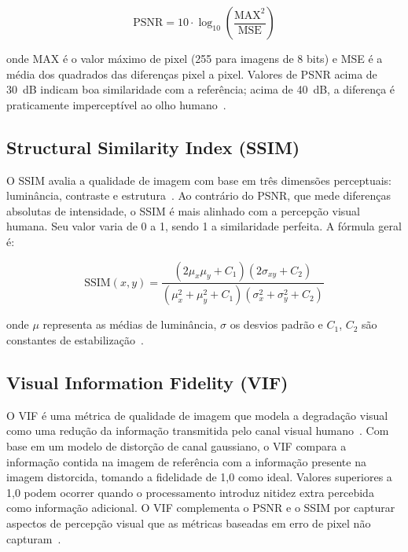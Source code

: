 \documentclass[twoside,english,brazilian]{UNISINOSmonografia}
\begin{document}
\begin{equation}
    \text{PSNR} = 10 \cdot \log_{10}\left(\frac{\text{MAX}^2}{\text{MSE}}\right)
    \label{eq:psnr}
\end{equation}

\noindent onde MAX é o valor máximo de pixel (255 para imagens de 8 bits) e MSE é a média dos quadrados das diferenças pixel a pixel. Valores de PSNR acima de 30~dB indicam boa similaridade com a referência; acima de 40~dB, a diferença é praticamente imperceptível ao olho humano~\cite{hore2010psnr}.

\subsection{Structural Similarity Index (SSIM)}

O SSIM avalia a qualidade de imagem com base em três dimensões perceptuais: luminância, contraste e estrutura~\cite{wang2004ssim}. Ao contrário do PSNR, que mede diferenças absolutas de intensidade, o SSIM é mais alinhado com a percepção visual humana. Seu valor varia de 0 a 1, sendo 1 a similaridade perfeita. A fórmula geral é:

\begin{equation}
    \text{SSIM}(x, y) = \frac{(2\mu_x\mu_y + C_1)(2\sigma_{xy} + C_2)}{(\mu_x^2 + \mu_y^2 + C_1)(\sigma_x^2 + \sigma_y^2 + C_2)}
    \label{eq:ssim}
\end{equation}

\noindent onde $\mu$ representa as médias de luminância, $\sigma$ os desvios padrão e $C_1$, $C_2$ são constantes de estabilização~\cite{wang2004ssim}.

\subsection{Visual Information Fidelity (VIF)}

O VIF é uma métrica de qualidade de imagem que modela a degradação visual como uma redução da informação transmitida pelo canal visual humano~\cite{sheikh2006vif}. Com base em um modelo de distorção de canal gaussiano, o VIF compara a informação contida na imagem de referência com a informação presente na imagem distorcida, tomando a fidelidade de 1,0 como ideal. Valores superiores a 1,0 podem ocorrer quando o processamento introduz nitidez extra percebida como informação adicional. O VIF complementa o PSNR e o SSIM por capturar aspectos de percepção visual que as métricas baseadas em erro de pixel não capturam~\cite{sheikh2006vif}.
\end{document}
